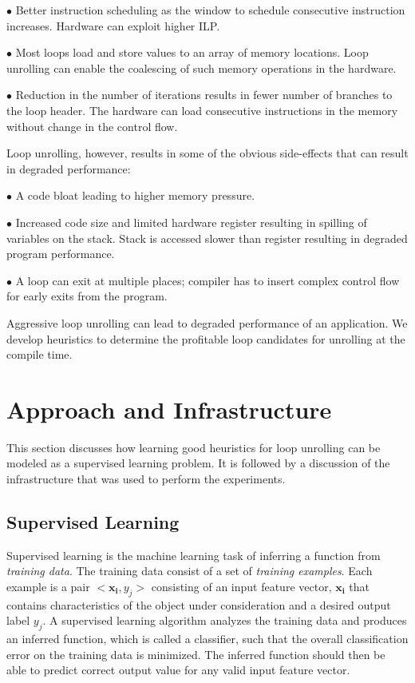 \documentclass[]{sig-alternate}
\begin{document}
\noindent $\bullet$ Better instruction scheduling as the window to schedule consecutive instruction increases. Hardware can exploit higher ILP.

\noindent $\bullet$ Most loops load and store values to an array of memory locations. Loop unrolling can enable the coalescing of such memory operations in the hardware.

\noindent $\bullet$ Reduction in the number of iterations results in fewer number of branches to the loop header. The hardware can load consecutive instructions in the memory without change in the control flow.

Loop unrolling, however, results in some of the obvious side-effects that can result in degraded performance:

\noindent $\bullet$ A code bloat leading to higher memory pressure.

\noindent $\bullet$ Increased code size and limited hardware register resulting in spilling of variables on the stack. Stack is accessed slower than register resulting in degraded program performance.

\noindent $\bullet$ A loop can exit at multiple places; compiler has to insert complex control flow for early exits from the program.

Aggressive loop unrolling can lead to degraded performance of an application. We develop heuristics to determine the profitable loop candidates for unrolling at the compile time.

\section{Approach and Infrastructure}
\label{sec:Approach}

This section discusses how learning good heuristics for loop unrolling can be modeled as a supervised learning problem. It is followed by a discussion of the infrastructure that was used to perform the experiments. 

\subsection{Supervised Learning}
\label{subsec:SupervisedLearning}
Supervised learning is the machine learning task of inferring a function from \emph{training data}. The training data consist of a set of \emph{training examples}. Each example is a pair  $<\mathbf{x_i}, y_j>$ consisting of an input feature vector, $\mathbf{x_i}$ that contains characteristics of the object under consideration and a desired output label $y_j$. A supervised learning algorithm analyzes the training data and produces an inferred function, which is called a classifier, such that the overall classification error on the training data is minimized. The inferred function should then be able to predict correct output value for any valid input feature vector. 
\end{document}
